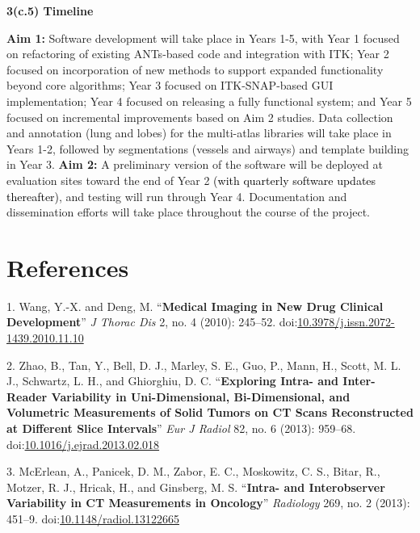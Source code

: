 \documentclass[11pt,]{article}
\begin{document}
\textbf{3(c.5) Timeline}

\textbf{Aim 1:} Software development will take place in Years 1-5, with
Year 1 focused on refactoring of existing ANTs-based code and
integration with ITK; Year 2 focused on incorporation of new methods to
support expanded functionality beyond core algorithms; Year 3 focused on
ITK-SNAP-based GUI implementation; Year 4 focused on releasing a fully
functional system; and Year 5 focused on incremental improvements based
on Aim 2 studies. Data collection and annotation (lung and lobes) for
the multi-atlas libraries will take place in Years 1-2, followed by
segmentations (vessels and airways) and template building in Year 3.
\textbf{Aim 2:} A preliminary version of the software will be deployed
at evaluation sites toward the end of Year 2
\textcolor{black}{(with quarterly software updates thereafter)}, and
testing will run through Year 4. Documentation and dissemination efforts
will take place throughout the course of the project.

\clearpage

\newpage

\section*{References}\label{references}

\hypertarget{refs}{}
\hypertarget{ref-Wang:2010aa}{}
1. Wang, Y.-X. and Deng, M. ``\textbf{Medical Imaging in New Drug
Clinical Development}'' \emph{J Thorac Dis} 2, no. 4 (2010): 245--52.
doi:\href{https://doi.org/10.3978/j.issn.2072-1439.2010.11.10}{10.3978/j.issn.2072-1439.2010.11.10}

\hypertarget{ref-Zhao:2013aa}{}
2. Zhao, B., Tan, Y., Bell, D. J., Marley, S. E., Guo, P., Mann, H.,
Scott, M. L. J., Schwartz, L. H., and Ghiorghiu, D. C.
``\textbf{Exploring Intra- and Inter-Reader Variability in
Uni-Dimensional, Bi-Dimensional, and Volumetric Measurements of Solid
Tumors on CT Scans Reconstructed at Different Slice Intervals}''
\emph{Eur J Radiol} 82, no. 6 (2013): 959--68.
doi:\href{https://doi.org/10.1016/j.ejrad.2013.02.018}{10.1016/j.ejrad.2013.02.018}

\hypertarget{ref-McErlean:2013aa}{}
3. McErlean, A., Panicek, D. M., Zabor, E. C., Moskowitz, C. S., Bitar,
R., Motzer, R. J., Hricak, H., and Ginsberg, M. S. ``\textbf{Intra- and
Interobserver Variability in CT Measurements in Oncology}''
\emph{Radiology} 269, no. 2 (2013): 451--9.
doi:\href{https://doi.org/10.1148/radiol.13122665}{10.1148/radiol.13122665}
\end{document}
